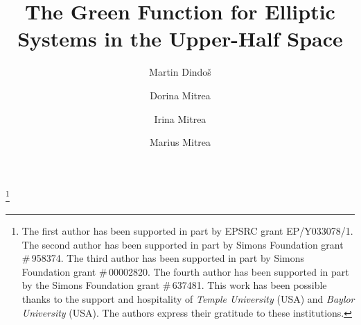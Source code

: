 \documentclass[11pt,reqno]{amsart}
\numberwithin{equation}{section}
\theoremstyle{remark}
\begin{document}
\allowdisplaybreaks

\title[Green Function]
{The Green Function for Elliptic Systems in the Upper-Half Space}


\author{Martin Dindo\v{s}}
\address{Martin Dindo\v{s}
\\
School of Mathematics, 
\\
The University of Edinburgh and 
\\
Maxwell Institute of Mathematical Sciences, UK} 


\author{Dorina Mitrea}
\address{Dorina Mitrea
\\
Department of Mathematics
\\
Baylor University
\\
Sid Richardson Bldg., 1410 S.~4th Street
\\
Waco, TX 76706, USA} 


\author{Irina Mitrea}
\address{Irina Mitrea
\\
Department of Mathematics
\\
Temple University\!
\\
1805\,N.\,Broad\,Street
\\
Philadelphia, PA 19122, USA} 


\author{Marius Mitrea\\ }
\address{Marius Mitrea
\\
Department of Mathematics
\\
Baylor University
\\
Sid Richardson Bldg., 1410 S.~4th Street
\\
Waco, TX 76706, USA} 




\thanks{The first author has been supported in part by EPSRC grant EP/Y033078/1.
The second author has been supported in part by Simons Foundation grant $\#\,$958374. The third author 
has been supported in part by Simons Foundation grant $\#\,$00002820.
The fourth author has been supported in part by the Simons Foundation grant $\#\,$637481. 
This work has been possible thanks to the support and hospitality
of \textit{Temple University} (USA) and \textit{Baylor University} (USA).
The authors express their gratitude to these institutions.}



\end{document}
